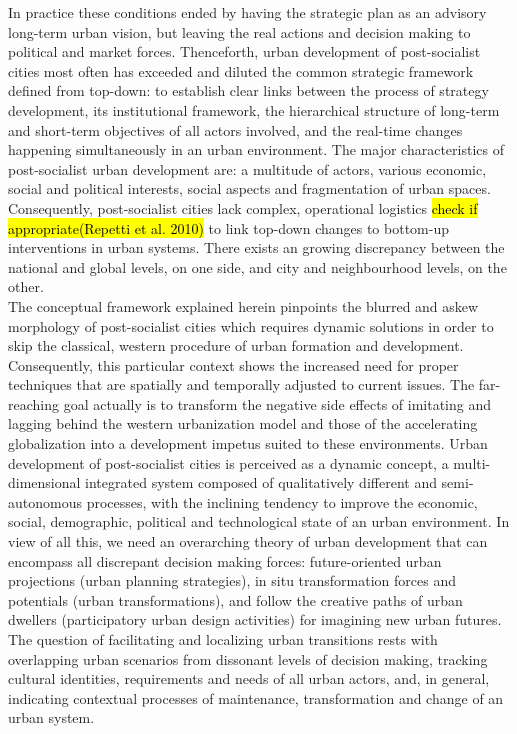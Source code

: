 \documentclass[11pt]{report}
\begin{document}
In practice these conditions ended by having the strategic plan as an advisory long-term urban vision, but leaving the real actions and decision making to political and market forces. Thenceforth, urban development of post-socialist cities most often has exceeded and diluted the common strategic framework defined from top-down: to establish clear links between the process of strategy development, its institutional framework, the hierarchical structure of long-term and short-term objectives of all actors involved, and the real-time changes happening simultaneously in an urban environment. The major characteristics of post-socialist urban development are: a multitude of actors, various economic, social and political interests, social aspects and fragmentation of urban spaces. Consequently, post-socialist cities lack complex, operational logistics \hl{check if appropriate(Repetti et al. 2010)} to link top-down changes to bottom-up interventions in urban systems. There exists an growing discrepancy between the national and global levels, on one side, and city and neighbourhood levels, on the other. 
\\
The  conceptual  framework  explained  herein  pinpoints  the  blurred  and  askew  morphology of  post-socialist  cities which  requires  dynamic  solutions  in  order  to  skip  the  classical, western procedure  of  urban  formation  and development. Consequently, this particular context shows the increased need for proper techniques that are spatially and temporally adjusted to current issues. The far-reaching goal actually is to transform the negative side effects of imitating and lagging behind the western urbanization model and those of the accelerating globalization into a development impetus suited to these environments. Urban development of post-socialist cities is perceived as a dynamic concept, a multi-dimensional integrated system composed of qualitatively different and semi-autonomous processes, with the inclining tendency to improve the economic, social, demographic, political and technological state of an urban environment. In view of all this, we need an overarching theory of urban development that can encompass all discrepant decision making forces: future-oriented urban projections (urban planning strategies), in situ transformation forces and potentials (urban transformations), and follow the creative paths of urban dwellers (participatory urban design activities) for imagining new urban futures. The question of facilitating and localizing urban transitions rests with overlapping urban scenarios from dissonant levels of decision making, tracking cultural identities, requirements and needs of all urban actors, and, in general, indicating contextual processes of maintenance, transformation and change of an urban system. 
\end{document}
